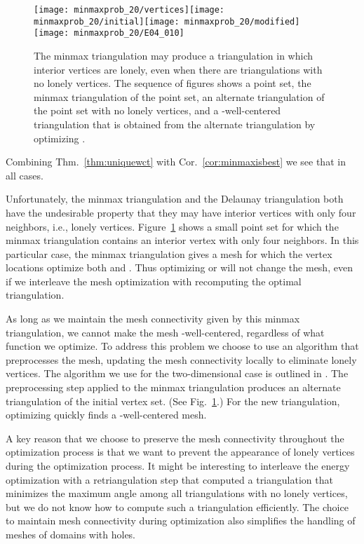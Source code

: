 \documentclass[final]{siamltex}
\begin{document}
\begin{figure}
  \centering
  \texttt{[image: minmaxprob\_20/vertices]}\hspace{10pt}\texttt{[image: minmaxprob\_20/initial]}\hspace{10pt}\texttt{[image: minmaxprob\_20/modified]}\hspace{10pt}\texttt{[image: minmaxprob\_20/E04\_010]}\caption{The minmax triangulation may produce a triangulation in
    which interior vertices are lonely, even when there are
    triangulations with no lonely vertices.  The sequence of figures
    shows a point set, the minmax triangulation of the point set, an
    alternate triangulation of the point set with no lonely vertices,
    and a -well-centered triangulation that is obtained from the
    alternate triangulation by optimizing .}
  \label{fig:minmaxproblem}
\end{figure}

Combining Thm.~\ref{thm:uniquewct} with Cor.~\ref{cor:minmaxisbest} we
see that  in all cases.

Unfortunately, the minmax triangulation and the Delaunay triangulation
both have the undesirable property that they may have interior
vertices with only four neighbors, i.e., lonely vertices.
Figure~\ref{fig:minmaxproblem} shows a small point set for which the
minmax triangulation contains an interior vertex with only four
neighbors.  In this particular case, the minmax triangulation gives a
mesh for which the vertex locations optimize both  and
.  Thus optimizing  or  will not change the
mesh, even if we interleave the mesh optimization with recomputing the
optimal triangulation.

As long as we maintain the mesh connectivity given by this minmax
triangulation, we cannot make the mesh -well-centered, regardless
of what function we optimize.  To address this problem we choose to
use an algorithm that preprocesses the mesh, updating the mesh
connectivity locally to eliminate lonely vertices.  The algorithm we
use for the two-dimensional case is outlined in \cite{VaHiGuRa2007}.
The preprocessing step applied to the minmax triangulation produces an
alternate triangulation of the initial vertex set.  (See
Fig.~\ref{fig:minmaxproblem}.)  For the new triangulation, optimizing
 quickly finds a -well-centered mesh.

A key reason that we choose to preserve the mesh connectivity
throughout the optimization process is that we want to
prevent the appearance of lonely vertices
during the optimization process.  It might
be interesting to interleave the energy optimization with a
retriangulation step that computed a triangulation that minimizes the
maximum angle among all triangulations with no lonely vertices, but we
do not know how to compute such a triangulation efficiently.  The
choice to maintain mesh connectivity during optimization also
simplifies the handling of meshes of domains with holes.
\end{document}
